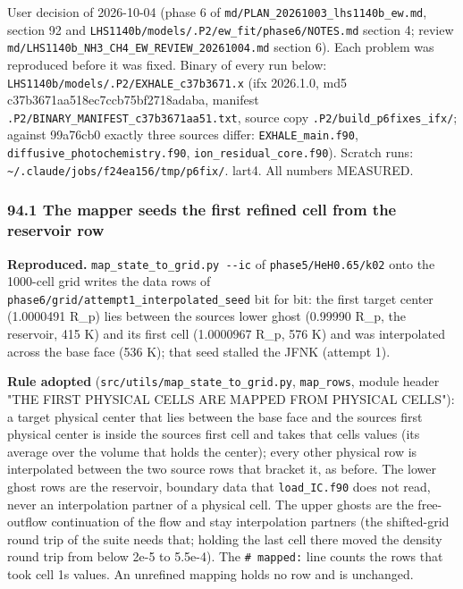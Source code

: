 \documentclass[english,a4paper]{my_memo}
\begin{document}
User decision of 2026-10-04 (phase 6 of \texttt{md/PLAN\_20261003\_lhs1140b\_ew.md},
section 92 and \texttt{LHS1140b/models/.P2/ew\_fit/phase6/NOTES.md} section 4; review
\texttt{md/LHS1140b\_NH3\_CH4\_EW\_REVIEW\_20261004.md} section 6). Each problem was
reproduced before it was fixed. Binary of every run below:
\texttt{LHS1140b/models/.P2/EXHALE\_c37b3671.x} (ifx 2026.1.0, md5
c37b3671aa518ec7ccb75bf2718adaba, manifest
\texttt{.P2/BINARY\_MANIFEST\_c37b3671aa51.txt}, source copy \texttt{.P2/build\_p6fixes\_ifx/};
against 99a76cb0 exactly three sources differ: \texttt{EXHALE\_main.f90},
\texttt{diffusive\_photochemistry.f90}, \texttt{ion\_residual\_core.f90}). Scratch runs:
\texttt{\textasciitilde{}/.claude/jobs/f24ea156/tmp/p6fix/}. lart4. All numbers MEASURED.

\subsubsection{94.1 The mapper seeds the first refined cell from the reservoir row}\label{941-the-mapper-seeds-the-first-refined-cell-from-the-reservoir-row}

\textbf{Reproduced.} \texttt{map\_state\_to\_grid.py\ -\/-ic} of \texttt{phase5/HeH0.65/k02} onto the
1000-cell grid writes the data rows of \texttt{phase6/grid/attempt1\_interpolated\_seed}
bit for bit: the first target center (1.0000491 R\_p) lies between the source\textquotesingle s
lower ghost (0.99990 R\_p, the reservoir, 415 K) and its first cell
(1.0000967 R\_p, 576 K) and was interpolated across the base face (536 K); that
seed stalled the JFNK (attempt 1).

\textbf{Rule adopted} (\texttt{src/utils/map\_state\_to\_grid.py}, \texttt{map\_rows}, module header
"THE FIRST PHYSICAL CELLS ARE MAPPED FROM PHYSICAL CELLS"): a target physical
center that lies between the base face and the source\textquotesingle s first physical center
is inside the source\textquotesingle s first cell and takes that cell\textquotesingle s values (its average
over the volume that holds the center); every other physical row is
interpolated between the two source rows that bracket it, as before. The
lower ghost rows are the reservoir, boundary data that \texttt{load\_IC.f90} does not
read, never an interpolation partner of a physical cell. The upper ghosts are
the free-outflow continuation of the flow and stay interpolation partners
(the shifted-grid round trip of the suite needs that; holding the last cell
there moved the density round trip from below 2e-5 to 5.5e-4). The \texttt{\#\ mapped:}
line counts the rows that took cell 1\textquotesingle s values. An unrefined mapping holds no
row and is unchanged.
\end{document}

